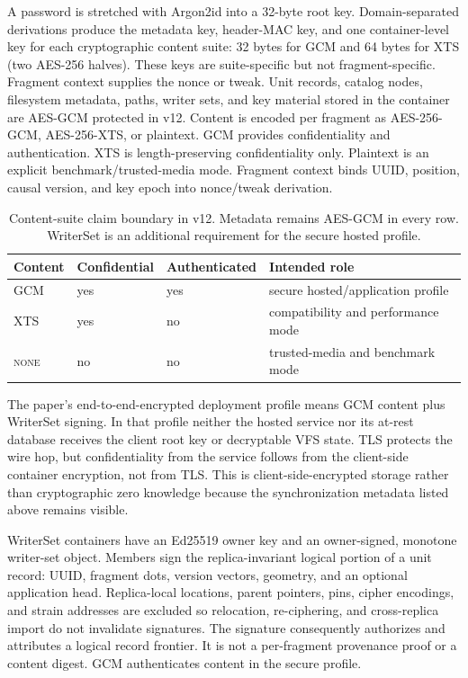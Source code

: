 A password is stretched with Argon2id into a 32-byte root key.  Domain-separated
derivations produce the metadata key, header-MAC key, and one container-level
key for each cryptographic content suite: 32 bytes for GCM and 64 bytes for XTS
(two AES-256 halves).  These keys are suite-specific but not fragment-specific.
Fragment context supplies the nonce or tweak.  Unit records, catalog nodes,
filesystem metadata, paths, writer sets, and key material stored in the
container are AES-GCM protected in v12.  Content is
encoded per fragment as AES-256-GCM, AES-256-XTS, or plaintext.  GCM provides
confidentiality and authentication.  XTS is length-preserving confidentiality
only.  Plaintext is an explicit benchmark/trusted-media mode.  Fragment context
binds UUID, position, causal version, and key epoch into nonce/tweak derivation.

\begin{table}[t]
  \centering
  \small
  \caption{Content-suite claim boundary in v12.  Metadata remains AES-GCM in
  every row.  WriterSet is an additional requirement for the secure hosted
  profile.}
  \label{tab:cipher-profiles}
  \begin{tabular}{@{}llll@{}}
    \toprule
    Content & Confidential & Authenticated & Intended role \\
    \midrule
    GCM & yes & yes & secure hosted/application profile \\
    XTS & yes & no & compatibility and performance mode \\
    \textsc{none} & no & no & trusted-media and benchmark mode \\
    \bottomrule
  \end{tabular}
\end{table}

The paper's end-to-end-encrypted deployment profile means GCM content plus
WriterSet signing.  In that profile neither the hosted service nor its at-rest
database receives the client root key or decryptable VFS state.  TLS protects
the wire hop, but confidentiality from the service follows from the client-side
container encryption, not from TLS.  This is client-side-encrypted storage
rather than cryptographic zero knowledge because the synchronization metadata
listed above remains visible.

WriterSet containers have an Ed25519 owner key and an owner-signed, monotone
writer-set object.  Members sign the replica-invariant logical portion of a unit
record: UUID, fragment dots, version vectors, geometry, and an optional
application head.  Replica-local locations, parent pointers, pins, cipher
encodings, and strain addresses are excluded so relocation, re-ciphering, and
cross-replica import do not invalidate signatures.  The signature consequently
authorizes and attributes a logical record frontier.  It is not a per-fragment
provenance proof or a content digest.  GCM authenticates content in the secure
profile.

